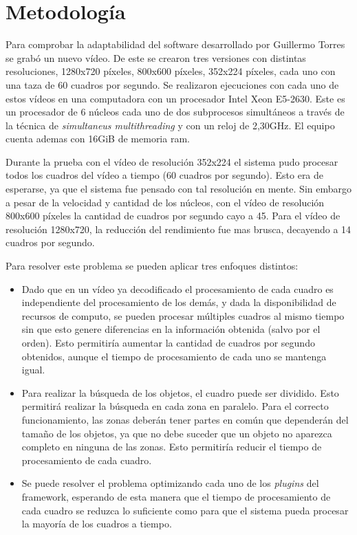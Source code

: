 
\section{Metodología}

Para comprobar la adaptabilidad del software desarrollado por Guillermo Torres
se grabó un nuevo vídeo. De este se crearon tres versiones con distintas
resoluciones, 1280x720 píxeles, 800x600 píxeles, 352x224 píxeles, cada uno con
una taza de 60 cuadros por segundo. Se realizaron ejecuciones con cada uno de
estos vídeos en una computadora con un procesador Intel Xeon E5-2630. Este es un
procesador de 6 núcleos cada uno de dos subprocesos simultáneos a través de la
técnica de \emph{simultaneus multithreading} y con un reloj de 2,30GHz. El
equipo cuenta ademas con 16GiB de memoria ram.

Durante la prueba con el vídeo de resolución 352x224 el sistema pudo procesar
todos los cuadros del vídeo a tiempo (60 cuadros por segundo). Esto era de
esperarse, ya que el sistema fue pensado con tal resolución en mente. Sin
embargo a pesar de la velocidad y cantidad de los núcleos, con el vídeo de
resolución 800x600 píxeles la cantidad de cuadros por segundo cayo a 45. Para el
vídeo de resolución 1280x720, la reducción del rendimiento fue mas brusca,
decayendo a 14 cuadros por segundo.

Para resolver este problema se pueden aplicar tres enfoques distintos:

\begin{itemize}

\item 	Dado que en un vídeo ya decodificado el procesamiento de cada cuadro es
	independiente del procesamiento de los demás, y dada la disponibilidad
	de recursos de computo, se pueden procesar múltiples cuadros al mismo
	tiempo sin que esto genere diferencias en la información obtenida (salvo
	por el orden). Esto permitiría aumentar la cantidad de cuadros por
	segundo obtenidos, aunque el tiempo de procesamiento de cada uno se
	mantenga igual.

\item	Para realizar la búsqueda de los objetos, el cuadro puede ser dividido.
	Esto permitirá realizar la búsqueda en cada zona en paralelo. Para el
	correcto funcionamiento, las zonas deberán tener partes en común que
	dependerán del tamaño de los objetos, ya que no debe suceder que un
	objeto no aparezca completo en ninguna de las zonas. Esto permitiría
	reducir el tiempo de procesamiento de cada cuadro.

\item	Se puede resolver el problema optimizando cada uno de los \emph{plugins}
	del framework, esperando de esta manera que el tiempo de procesamiento
	de cada cuadro se reduzca lo suficiente como para que el sistema pueda
	procesar la mayoría de los cuadros a tiempo.

\end{itemize}

